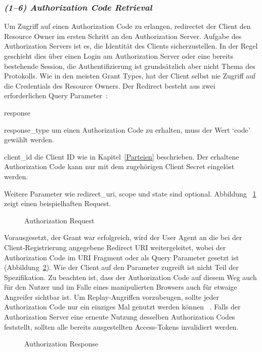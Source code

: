 \subsubsection{\textit{(1--6) Authorization Code Retrieval}} Um Zugriff auf einen
Authorization Code zu erlangen, redirectet der Client den Resource Owner im
ersten Schritt an den Authorization Server. Aufgabe des Authorization Servers
ist es, die Identität des Clients sicherzustellen. In der Regel geschieht dies
über einen Login am Authorization Server oder eine bereits bestehende Session,
die Authentifizierung ist grundsätzlich aber nicht Thema des Protokolls. Wie in
den meisten \glspl{Grant Type}, hat der Client selbst nie Zugriff auf die
Credentials des Resource Owners. Der Redirect besteht aus zwei erforderlichen Query
Parameter~:
\begin{labeling}{response}
    \item [response\_type] um einen Authorization Code zu erhalten,
    muss der Wert `code' gewählt werden.
    \item [client\_id] die Client ID wie in Kapitel~\ref{Parteien}
    beschrieben. Der erhaltene Authorization Code kann nur mit dem
    zugehörigen Client Secret eingelöst werden.
\end{labeling}
Weitere Parameter wie redirect\_uri, scope und state sind optional. Abbildung
~\ref{ls: Authorization Request} zeigt einen beispielhaften Request.
\begin{figure}[h]
    \scalebox{.8}{
        
    }
    \caption{Authorization Request~\protect{}}\label{ls: Authorization Request}
\end{figure}\noindent
Vorausgesetzt, der Grant war erfolgreich, wird der User Agent an die bei der
Client-Registrierung angegebene Redirect URI weitergeleitet, wobei der
Authorization Code im URI Fragment oder als Query Parameter gesetzt
ist~ (Abbildung~\ref{ls: Authorization Response}). Wie
der Client auf den Parameter zugreift ist nicht Teil der Spezifikation. Zu
beachten ist, dass der Authorization Code auf diesem Weg auch für den Nutzer und
im Falle eines manipulierten Browsers auch für etwaige Angreifer sichtbar ist.
Um Replay-Angriffen vorzubeugen, sollte jeder Authorization Code nur ein
einziges Mal genutzt werden können~ . Falls der
Authorization Server eine erneute Nutzung desselben Authorization Codes
feststellt, sollten alle bereits ausgestellten Access-Tokens invalidiert werden.
\begin{figure}[h]
    \scalebox{.8}{
        
    }
    \caption{Authorization
    Response~\protect{}}\label{ls: Authorization Response}
\end{figure}

